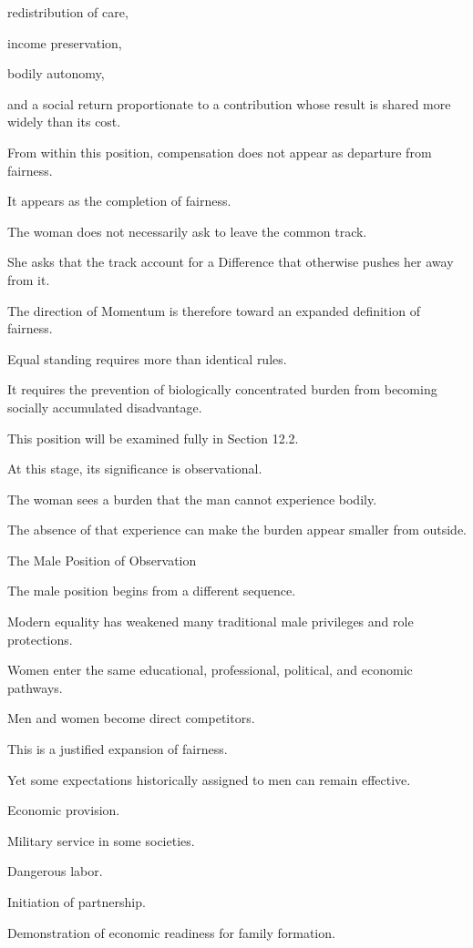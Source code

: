 redistribution of care,

income preservation,

bodily autonomy,

and a social return proportionate to a contribution whose result is shared more widely than its cost.

From within this position, compensation does not appear as departure from fairness.

It appears as the completion of fairness.

The woman does not necessarily ask to leave the common track.

She asks that the track account for a Difference that otherwise pushes her away from it.

The direction of Momentum is therefore toward an expanded definition of fairness.

Equal standing requires more than identical rules.

It requires the prevention of biologically concentrated burden from becoming socially accumulated disadvantage.

This position will be examined fully in Section 12.2.

At this stage, its significance is observational.

The woman sees a burden that the man cannot experience bodily.

The absence of that experience can make the burden appear smaller from outside.

The Male Position of Observation

The male position begins from a different sequence.

Modern equality has weakened many traditional male privileges and role protections.

Women enter the same educational, professional, political, and economic pathways.

Men and women become direct competitors.

This is a justified expansion of fairness.

Yet some expectations historically assigned to men can remain effective.

Economic provision.

Military service in some societies.

Dangerous labor.

Initiation of partnership.

Demonstration of economic readiness for family formation.

